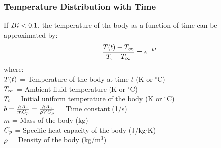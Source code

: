 \subsubsection*{Temperature Distribution with Time}
If $Bi < 0.1$, the temperature of the body as a function of time can be approximated by:
\begin{equation}
    \frac{T(t) - T_{\infty}}{T_i - T_{\infty}} = e^{-bt}
\end{equation}
where: \\
$T(t)$ = Temperature of the body at time $t$ (K or $^\circ$C) \\
$T_{\infty}$ = Ambient fluid temperature (K or $^\circ$C) \\
$T_i$ = Initial uniform temperature of the body (K or $^\circ$C) \\
$b = \frac{h A_s}{m C_p} = \frac{h A_s}{\rho V C_p}$ = Time constant (1/s) \\
$m$ = Mass of the body (kg) \\
$C_p$ = Specific heat capacity of the body (J/kg$\cdot$K) \\
$\rho$ = Density of the body (kg/m$^3$)